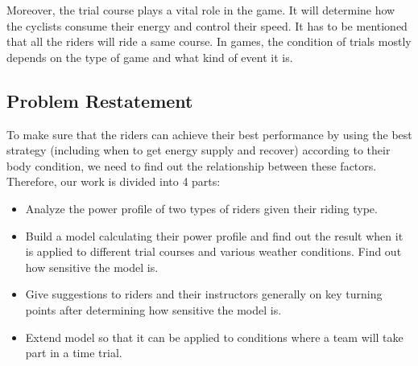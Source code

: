 \documentclass{article}
\begin{document}
		Moreover, the trial course plays a vital role in the game. It will determine how the cyclists consume their energy and control their speed. It has to be mentioned that all the riders will ride a same course. In games, the condition of trials mostly depends on the type of game and what kind of event it is.
		\subsection{Problem Restatement}
		To make sure that the riders can achieve their best performance by using the best strategy (including when to get energy supply and recover) according  to their body condition, we need to find out the relationship between these factors. Therefore, our work is divided into 4 parts:
		\begin{itemize}
			\item  Analyze the power profile of two types of riders given their riding type.
			\item  Build a model calculating their power profile and find out the result when it is applied to different trial courses and various weather conditions. Find out how sensitive the model is.
			\item  Give suggestions to riders and their instructors generally on key turning points after determining how sensitive the model is.
			\item  Extend model so that it can be applied to conditions where a team will take part in a time trial.
		\end{itemize}
\end{document}
